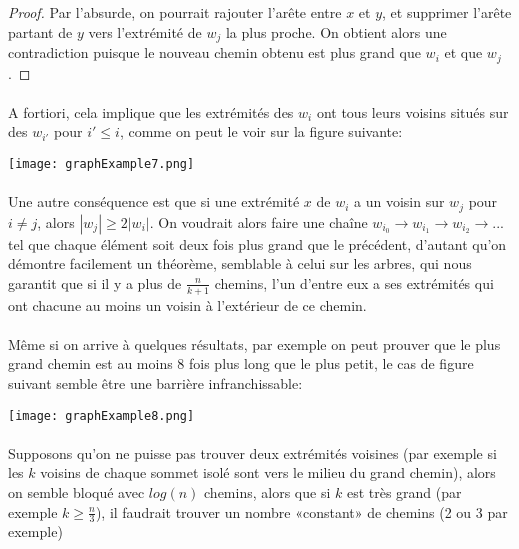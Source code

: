 \documentclass[a4paper]{article}
\theoremstyle{definition}
\theoremstyle{remark}
\begin{document}
\begin{proof}
Par l'absurde, on pourrait rajouter l'arête entre $x$ et $y$, et
supprimer l'arête partant de $y$ vers l'extrémité de $w_{j}$ la plus
proche. On obtient alors une contradiction puisque le nouveau chemin obtenu est plus grand que $w_{i}$ et que $w_{j}$.
\end{proof}


\paragraph{}
A fortiori, cela implique que les extrémités des $w_{i}$ ont tous leurs
voisins situés sur des $w_{i'}$ pour $i' \leq i$, comme on peut le voir 
sur la figure suivante:

\texttt{[image: graphExample7.png]}

\paragraph{}
Une autre conséquence est que si une extrémité $x$ de $w_{i}$ a un voisin sur $w_{j}$ pour $i \neq j$, alors $|w_{j}| \geq 2|w_{i}|$. On 
voudrait alors faire une chaîne $w_{i_{0}} \rightarrow w_{i_{1}} \rightarrow w_{i_{2}} \rightarrow ...$ tel que chaque élément soit deux 
fois plus grand que le précédent, d'autant qu'on démontre facilement un théorème, semblable à celui sur les arbres, qui nous garantit que si il y a plus de $\frac{n}{k+1}$ chemins, l'un d'entre eux a ses extrémités qui ont chacune au moins un voisin à l'extérieur de ce chemin.

\paragraph{}
Même si on arrive à quelques résultats, par exemple on peut prouver que le plus grand chemin est au moins 8 fois plus long que le plus petit, le cas de figure 
suivant semble être une barrière infranchissable:

\texttt{[image: graphExample8.png]}

\paragraph{}
Supposons qu'on ne puisse pas trouver deux extrémités voisines (par exemple si les $k$ voisins de chaque sommet isolé sont vers le milieu du 
grand chemin), alors on semble bloqué avec $log(n)$ chemins, alors que si $k$ est très grand (par exemple $k \geq \frac{n}{3}$), il faudrait trouver un nombre «constant» de chemins (2 ou 3 par exemple)
\end{document}
